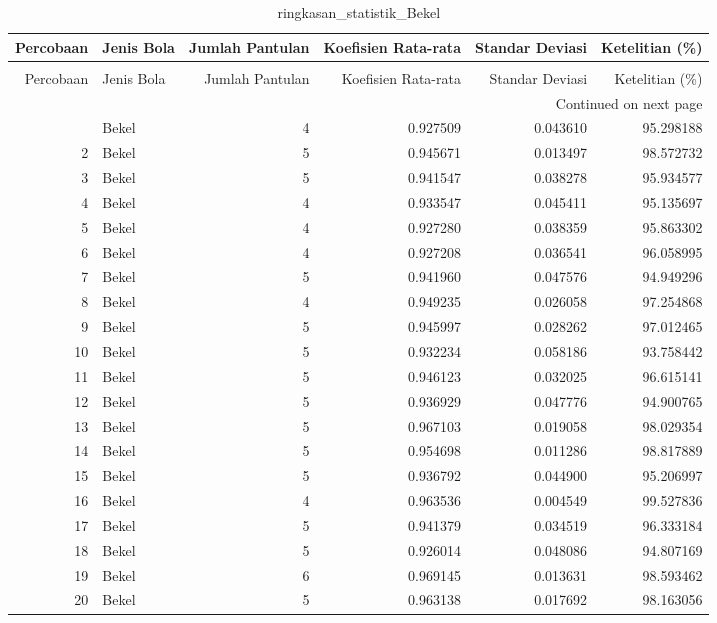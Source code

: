 \begin{longtable}{rlrrrr}
\caption{ringkasan_statistik_Bekel} \label{tab:ringkasan_Bekel} \\
\toprule
Percobaan & Jenis Bola & Jumlah Pantulan & Koefisien Rata-rata & Standar Deviasi & Ketelitian (\%) \\
\midrule
\endfirsthead
\caption[]{ringkasan_statistik_Bekel} \\
\toprule
Percobaan & Jenis Bola & Jumlah Pantulan & Koefisien Rata-rata & Standar Deviasi & Ketelitian (\%) \\
\midrule
\endhead
\midrule
\multicolumn{6}{r}{Continued on next page} \\
\midrule
\endfoot
\bottomrule
\endlastfoot
1 & Bekel & 4 & 0.927509 & 0.043610 & 95.298188 \\
2 & Bekel & 5 & 0.945671 & 0.013497 & 98.572732 \\
3 & Bekel & 5 & 0.941547 & 0.038278 & 95.934577 \\
4 & Bekel & 4 & 0.933547 & 0.045411 & 95.135697 \\
5 & Bekel & 4 & 0.927280 & 0.038359 & 95.863302 \\
6 & Bekel & 4 & 0.927208 & 0.036541 & 96.058995 \\
7 & Bekel & 5 & 0.941960 & 0.047576 & 94.949296 \\
8 & Bekel & 4 & 0.949235 & 0.026058 & 97.254868 \\
9 & Bekel & 5 & 0.945997 & 0.028262 & 97.012465 \\
10 & Bekel & 5 & 0.932234 & 0.058186 & 93.758442 \\
11 & Bekel & 5 & 0.946123 & 0.032025 & 96.615141 \\
12 & Bekel & 5 & 0.936929 & 0.047776 & 94.900765 \\
13 & Bekel & 5 & 0.967103 & 0.019058 & 98.029354 \\
14 & Bekel & 5 & 0.954698 & 0.011286 & 98.817889 \\
15 & Bekel & 5 & 0.936792 & 0.044900 & 95.206997 \\
16 & Bekel & 4 & 0.963536 & 0.004549 & 99.527836 \\
17 & Bekel & 5 & 0.941379 & 0.034519 & 96.333184 \\
18 & Bekel & 5 & 0.926014 & 0.048086 & 94.807169 \\
19 & Bekel & 6 & 0.969145 & 0.013631 & 98.593462 \\
20 & Bekel & 5 & 0.963138 & 0.017692 & 98.163056 \\
\end{longtable}

